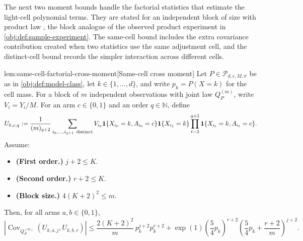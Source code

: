 \documentclass[11pt]{article}
\begin{document}
The next two moment bounds handle the factorial statistics that estimate the light-cell polynomial terms. They are stated for an independent block of size  with product law , the block analogue of the observed product experiment in \cref{obj:def:sample-experiment}. The same-cell bound includes the extra covariance contribution created when two statistics use the same adjustment cell, and the distinct-cell bound records the simpler interaction across different cells.

\begin{lemmav}{lem:same-cell-factorial-cross-moment}[Same-cell cross moment]
Let \(P\in\mathcal P_{d,\epsilon,M,\sigma}\) be as in \cref{obj:def:model-class}, let \(k\in\{1,\ldots,d\}\), and write \(p_k=P(X=k)\) for the cell mass.  For a block of \(m\) independent observations with joint law \(Q_P^{(m)}\), write \(V_i=Y_i/M\).  For an arm \(c\in\{0,1\}\) and an order \(q\in\mathbb N\), define
\[
U_{k,c,q}
:=
\frac{1}{(m)_{q+2}}
\sum_{i_0,\ldots,i_{q+1}\ {\rm distinct}}
V_{i_0}\mathbf 1\{X_{i_0}=k,A_{i_0}=c\}
\mathbf 1\{X_{i_1}=k\}
\prod_{t=2}^{q+1}\mathbf 1\{X_{i_t}=k,A_{i_t}=c\}.
\]
Assume:
\begin{itemize}
\item \textbf{(First order.)} \(j+2\le K\).
\item \textbf{(Second order.)} \(r+2\le K\).
\item \textbf{(Block size.)} \(4(K+2)^2\le m\).
\end{itemize}
Then, for all arms \(a,b\in\{0,1\}\),
\[
\left|\operatorname{Cov}_{Q_P^{(m)}}\!\left(U_{k,a,j},U_{k,b,r}\right)\right|
\le
\frac{2(K+2)^2}{m}\,p_k^{j+2}p_k^{r+2}
+
\exp(1)\left(\frac54p_k\right)^{r+2}
\left(\frac54p_k+\frac{r+2}{m}\right)^{j+2}.
\]
\end{lemmav}
\end{document}
